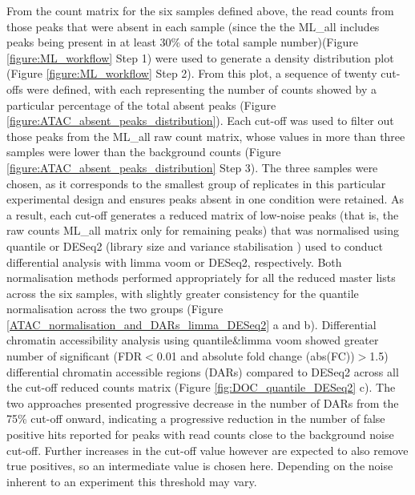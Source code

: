From the count matrix for the six samples defined above, the read counts from those peaks that were absent in each sample (since the the ML\_all includes peaks being present in at least 30\% of the total sample number)(Figure \ref{figure:ML_workflow} Step 1) were used to generate a density distribution plot (Figure \ref{figure:ML_workflow} Step 2). From this plot, a sequence of twenty cut-offs were defined, with each representing the number of counts showed by a particular percentage of the total absent peaks (Figure \ref{figure:ATAC_absent_peaks_distribution}). Each cut-off was used to filter out those peaks from the ML\_all raw count matrix, whose values in more than three samples were lower than the background counts (Figure \ref{figure:ATAC_absent_peaks_distribution} Step 3). The three samples were chosen, as it corresponds to the smallest group of replicates in this particular experimental design and ensures peaks absent in one condition were retained. As a result, each cut-off generates a reduced matrix of low-noise peaks (that is, the raw counts ML\_all matrix only for remaining peaks) that was normalised using quantile or DESeq2 (library size and variance stabilisation \parencite{Love2014}) used to conduct differential analysis with limma voom or DESeq2, respectively. Both normalisation methods performed appropriately for all the reduced master lists across the six samples, with slightly greater consistency for the quantile normalisation across the two groups (Figure \ref{ATAC_normalisation_and_DARs_limma_DESeq2} a and b). Differential chromatin accessibility analysis using quantile\&limma voom showed greater number of significant (FDR$<$0.01 and absolute fold change (abs(FC))$>$1.5) differential chromatin accessible regions (DARs) compared to DESeq2 across all the cut-off reduced counts matrix (Figure \ref{fig:DOC_quantile_DESeq2} c). The two approaches presented progressive decrease in the number of DARs from the 75\% cut-off onward, indicating a progressive reduction in the number of false positive hits reported for peaks with read counts close to the background noise cut-off. Further increases in the cut-off value however are expected to also remove true positives, so an intermediate value is chosen here. Depending on the noise inherent to an experiment this threshold may vary. 

